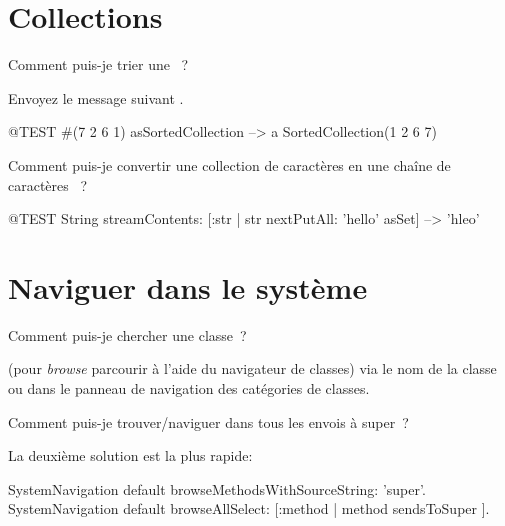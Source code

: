 \documentclass[a4paper,10pt,twoside]{book}
\begin{document}
\section{Collections}

\begin{faq}
Comment puis-je trier une ~?

\end{faq}
\answer
Envoyez le message suivant .

\begin{code}{@TEST}
#(7 2 6 1) asSortedCollection --> a SortedCollection(1 2 6 7)
\end{code}

\begin{faq}
Comment puis-je convertir une collection de caract\`eres en une 
cha\^ine de caract\`eres
~?
\end{faq}
\answer
\begin{code}{@TEST}
String streamContents: [:str | str nextPutAll: 'hello' asSet] --> 'hleo'
\end{code}

\section{Naviguer dans le syst\`eme}

\begin{faq}
Comment puis-je chercher une classe~?
\end{faq}
\answer
 (pour \emph{browse} \cad parcourir \`a l'aide du navigateur de classes) via le nom de la classe ou  dans le panneau de navigation des cat\'egories de classes.

\begin{faq}
Comment puis-je trouver/naviguer dans tous les envois 
\`a
 super~?
\end{faq}
\answer
La deuxi\`eme solution est la plus rapide:
\begin{code}{}
SystemNavigation default browseMethodsWithSourceString: 'super'.
SystemNavigation default browseAllSelect: [:method | method sendsToSuper ].
\end{code}
\end{document}
